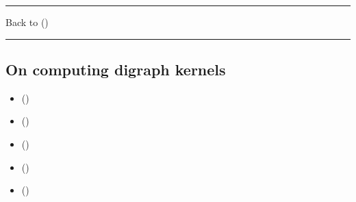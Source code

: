 \documentclass[a4paper,12pt,english]{sphinxhowto}
\begin{document}
\bigskip\hrule\bigskip


\sphinxAtStartPar
Back to {\hyperref[\detokenize{pearls:pearls-label}]{}} ()


\bigskip\hrule\bigskip



\subsection{On computing digraph kernels}
\label{\detokenize{pearls:on-computing-digraph-kernels}}\label{\detokenize{pearls:kernel-tutorial-label}}
\begin{sphinxcontents}
\begin{itemize}
\item {} 
\sphinxAtStartPar
{}\label{\detokenize{pearls:id157}}{\hyperref[\detokenize{pearls:what-is-a-graph-kernel}]{}} ()

\item {} 
\sphinxAtStartPar
{}\label{\detokenize{pearls:id158}}{\hyperref[\detokenize{pearls:initial-and-terminal-kernels}]{}} ()

\item {} 
\sphinxAtStartPar
{}\label{\detokenize{pearls:id159}}{\hyperref[\detokenize{pearls:kernels-in-lateralized-digraphs}]{}} ()

\item {} 
\sphinxAtStartPar
{}\label{\detokenize{pearls:id160}}{\hyperref[\detokenize{pearls:computing-first-and-last-choice-recommendations}]{}} ()

\item {} 
\sphinxAtStartPar
{}\label{\detokenize{pearls:id161}}{\hyperref[\detokenize{pearls:tractability}]{}} ()

\end{itemize}
\end{sphinxcontents}
\end{document}
